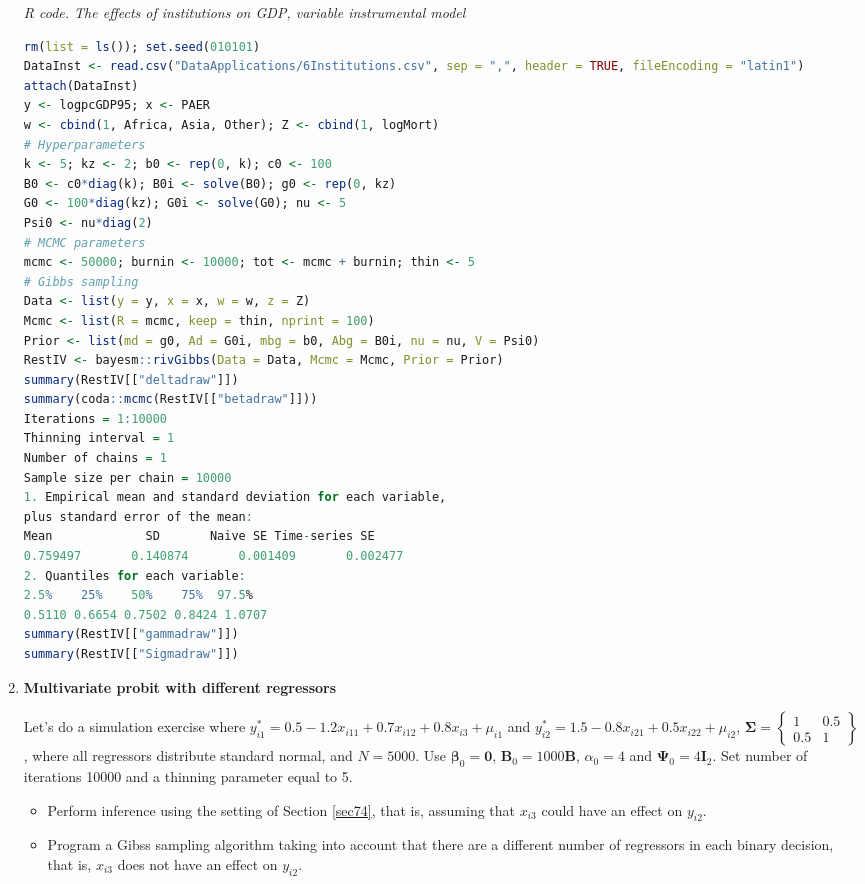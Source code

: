 \begin{enumerate}[leftmargin=*]
\begin{tcolorbox}[enhanced,width=4.67in,center upper,
	fontupper=\large\bfseries,drop shadow southwest,sharp corners]
	\textit{R code. The effects of institutions on GDP, variable instrumental model}
	\begin{VF}
		\begin{lstlisting}[language=R]
rm(list = ls()); set.seed(010101)
DataInst <- read.csv("DataApplications/6Institutions.csv", sep = ",", header = TRUE, fileEncoding = "latin1")
attach(DataInst)
y <- logpcGDP95; x <- PAER
w <- cbind(1, Africa, Asia, Other); Z <- cbind(1, logMort)
# Hyperparameters
k <- 5; kz <- 2; b0 <- rep(0, k); c0 <- 100
B0 <- c0*diag(k); B0i <- solve(B0); g0 <- rep(0, kz)
G0 <- 100*diag(kz); G0i <- solve(G0); nu <- 5
Psi0 <- nu*diag(2)
# MCMC parameters
mcmc <- 50000; burnin <- 10000; tot <- mcmc + burnin; thin <- 5
# Gibbs sampling
Data <- list(y = y, x = x, w = w, z = Z)
Mcmc <- list(R = mcmc, keep = thin, nprint = 100)
Prior <- list(md = g0, Ad = G0i, mbg = b0, Abg = B0i, nu = nu, V = Psi0)
RestIV <- bayesm::rivGibbs(Data = Data, Mcmc = Mcmc, Prior = Prior)
summary(RestIV[["deltadraw"]])
summary(coda::mcmc(RestIV[["betadraw"]]))
Iterations = 1:10000
Thinning interval = 1 
Number of chains = 1 
Sample size per chain = 10000 
1. Empirical mean and standard deviation for each variable,
plus standard error of the mean:
Mean             SD       Naive SE Time-series SE 
0.759497       0.140874       0.001409       0.002477 
2. Quantiles for each variable:
2.5%    25%    50%    75%  97.5% 
0.5110 0.6654 0.7502 0.8424 1.0707 
summary(RestIV[["gammadraw"]])
summary(RestIV[["Sigmadraw"]])
\end{lstlisting}
	\end{VF}
\end{tcolorbox}

\item \textbf{Multivariate probit with different regressors}

Let's do a simulation exercise where $y_{i1}^*=0.5-1.2x_{i11}+0.7x_{i12}+0.8x_{i3}+\mu_{i1}$ and $y_{i2}^*=1.5-0.8x_{i21}+0.5x_{i22}+\mu_{i2}$, $\bm{\Sigma}=\begin{Bmatrix}
	1 & 0.5\\
	0.5 & 1
\end{Bmatrix}$, where all regressors distribute standard normal, and $N=5000$. Use $\bm{\beta}_0=\bm{0}$, $\bm{B}_0=1000\bm{B}$, $\alpha_0=4$ and $\bm{\Psi}_0=4\bm{I}_2$. Set number of iterations 10000 and a thinning parameter equal to 5.   

\begin{itemize}
	\item Perform inference using the setting of Section \ref{sec74}, that is, assuming that $x_{i3}$ could have an effect on $y_{i2}$.
	\item Program a Gibss sampling algorithm taking into account that there are a different number of regressors in each binary decision, that is, $x_{i3}$ does not have an effect on $y_{i2}$. 
\end{itemize} 


\end{enumerate}
